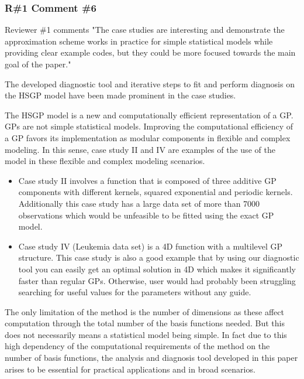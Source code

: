 \documentclass[11pt]{report}
\begin{document}
\subsubsection*{R\#1 Comment \#6}

Reviewer \#1 comments "The case studies are interesting and demonstrate the approximation scheme works in practice for simple statistical models while providing clear example codes, but they could be more focused towards the main goal of the paper."

The developed diagnostic tool and iterative steps to fit and perform diagnosis on the HSGP model have been made prominent in the case studies.

The HSGP model is a new and computationally efficient representation of a GP. GPs are not simple statistical models. Improving the computational efficiency of a GP favors its implementation as modular components in flexible and complex modeling. In this sense, case study II and IV are examples of the use of the model in these flexible and complex modeling scenarios.

\begin{itemize}
\item Case study II involves a function that is composed of three additive GP components with different kernels, squared exponential and periodic kernels. Additionally this case study has a large data set of more than 7000 observations which would be unfeasible to be fitted using the exact GP model.

\item Case study IV (Leukemia data set) is a 4D function with a multilevel GP structure. This case study is also a good example that by using our diagnostic tool you can easily get an optimal solution in 4D which makes it significantly faster than regular GPs. Otherwise, user would had probably been struggling searching for useful values for the parameters without any guide.
\end{itemize}

The only limitation of the method is the number of dimensions as these affect computation through the total number of the basis functions needed. But this does not necessarily means a statistical model being simple.
In fact due to this high dependency of the computational requirements of the method on the number of basis functions, the analysis and diagnosis tool developed in this paper arises to be essential for practical applications and in broad scenarios.
\end{document}

